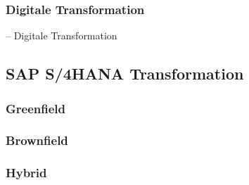 \subsubsection{Digitale Transformation}
-- Digitale Transformation

\subsection{SAP S/4HANA Transformation}
\subsubsection{Greenfield}
\subsubsection{Brownfield}
\subsubsection{Hybrid}

